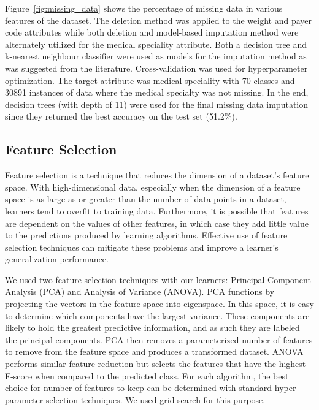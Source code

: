 \documentclass[conference]{IEEEtran}
\begin{document}
Figure~\ref{fig:missing_data} shows the percentage of missing data in various features of the dataset. The deletion method was applied to the weight and payer code attributes while both deletion and model-based imputation method were alternately utilized for the medical speciality attribute. Both a decision tree  and k-nearest neighbour classifier were used as models for the imputation method as was suggested from the literature. Cross-validation was used for hyperparameter optimization. The target attribute was medical speciality with 70 classes and 30891 instances of data where the medical specialty was not missing. In the end, decision trees (with depth of 11) were used for the final missing data imputation since they returned the best accuracy on the test set (51.2\%).

\subsection{Feature Selection}
Feature selection is a technique that reduces the dimension of a dataset's feature space. With high-dimensional data, especially when the dimension of a feature space is as large as or greater than the number of data points in a dataset, learners tend to overfit to training data. Furthermore, it is possible that features are dependent on the values of other features, in which case they add little value to the predictions produced by learning algorithms. Effective use of feature selection techniques can mitigate these problems and improve a learner's generalization performance. 

We used two feature selection techniques with our learners: Principal Component Analysis (PCA) and Analysis of Variance (ANOVA). PCA functions by projecting the vectors in the feature space into eigenspace. In this space, it is easy to determine which components have the largest variance. These components are likely to hold the greatest predictive information, and as such they are labeled the principal components. PCA then removes a parameterized number of features to remove from the feature space and produces a transformed dataset. ANOVA performs similar feature reduction but selects the features that have the highest F-score when compared to the predicted class. For each algorithm, the best choice for number of features to keep can be determined with standard hyper parameter selection techniques. We used grid search for this purpose.
\end{document}
